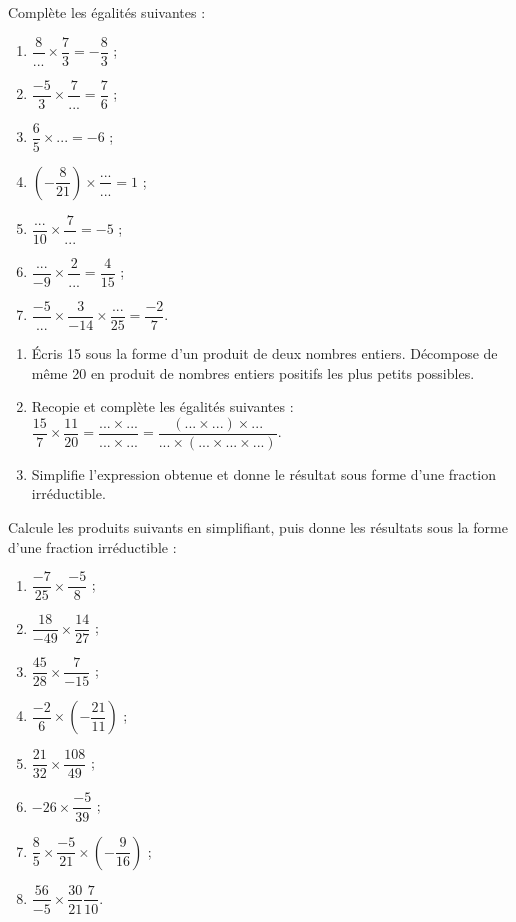 \begin{exercice}Complète les égalités  suivantes :
\begin{enumerate}
\item $\dfrac{8}{...} \times \dfrac{7}{3} = -\dfrac{8}{3}$ ; 
\item $\dfrac{-5}{3} \times \dfrac{7}{...} = \dfrac{7}{6}$ ;
\item $\dfrac{6}{5} \times ... = -6$ ;
\item $\left(-\dfrac{8}{21}\right) \times \dfrac{...}{...} = 1$ ;
\item $\dfrac{...}{10} \times \dfrac{7}{...} = -5$ ;
\item $\dfrac{...}{-9} \times \dfrac{2}{...} = \dfrac{4}{15}$ ;
\item $\dfrac{-5}{...} \times \dfrac{3}{-14} \times \dfrac{...}{25} = \dfrac{-2}{7}$.
\end{enumerate}
\end{exercice}




\begin{exercice}
\begin{enumerate}
\item Écris 15 sous la forme d'un produit de deux nombres entiers. Décompose de même 20 en produit de nombres entiers positifs les plus petits possibles.
\item Recopie et complète les égalités suivantes :
$\dfrac{15}{7} \times \dfrac{11}{20} = \dfrac{... \times ...}{... \times ...} = \dfrac{(... \times ...) \times ...}{... \times (... \times ... \times ...)}$.
\item Simplifie l'expression obtenue et donne le résultat sous forme d'une fraction irréductible.
\end{enumerate}
\end{exercice}





\begin{exercice}
Calcule les produits suivants en simplifiant, puis donne les résultats sous la forme d'une fraction irréductible :
\begin{enumerate}
\item $\dfrac{-7}{25} \times \dfrac{-5}{8}$ ;
\item $\dfrac{18}{-49} \times \dfrac{14}{27}$ ;
\item $\dfrac{45}{28} \times \dfrac{7}{-15}$ ;
\item $\dfrac{-2}{6} \times \left(-\dfrac{21}{11}\right)$ ;
\item $\dfrac{21}{32} \times \dfrac{108}{49}$ ;
\item $-26 \times \dfrac{-5}{39}$ ;
\item $\dfrac{8}{5} \times \dfrac{-5}{21} \times \left(-\dfrac{9}{16}\right)$ ;
\item $\dfrac{56}{-5} \times \dfrac{30}{21} \dfrac{7}{10}$.
\end{enumerate}
\end{exercice} 




